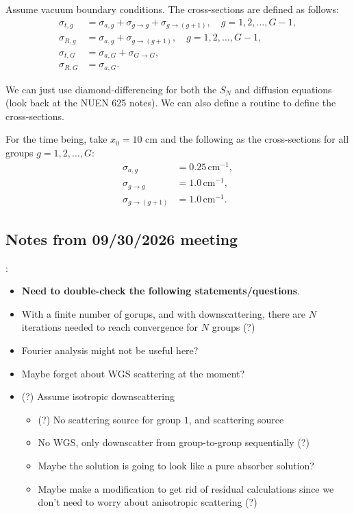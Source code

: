 \documentclass{article}
\newcommand{\parens}[1]{\left( #1 \right)}
\begin{document}
Assume vacuum boundary conditions.
The cross-sections are defined as follows:
\begin{align}
  \sigma_{t, g} & = \sigma_{a, g} + \sigma_{g \rightarrow g} + \sigma_{g \rightarrow \parens{g + 1}}, \quad g = 1, 2, \ldots, G - 1, \\
  \sigma_{R, g} & = \sigma_{a, g} + \sigma_{g \rightarrow \parens{g + 1}}, \quad g = 1, 2, \ldots, G - 1,                            \\
  \sigma_{t, G} & = \sigma_{a, G} + \sigma_{G \rightarrow G},                                                                        \\
  \sigma_{R, G} & = \sigma_{a, G}.
\end{align}

We can just use diamond-differencing for both the $S_{N}$ and diffusion equations (look back at the NUEN 625 notes).
We can also define a routine to define the cross-sections.

For the time being, take $x_{0} = 10$ cm and the following as the cross-sections for all groups $g = 1, 2, \ldots, G$:
\begin{align}
  \sigma_{a, g}                         & = 0.25 \, \text{cm}^{-1}, \\
  \sigma_{g \rightarrow g}              & = 1.0 \, \text{cm}^{-1},  \\
  \sigma_{g \rightarrow \parens{g + 1}} & = 1.0 \, \text{cm}^{-1}.
\end{align}

\subsection{Notes from 09/30/2026 meeting}:
\begin{itemize}
  \item \textbf{Need to double-check the following statements/questions}.
  \item With a finite number of gorups, and with downscattering, there are $N$ iterations needed to reach convergence for $N$ groups (?)
  \item Fourier analysis might not be useful here?
  \item Maybe forget about WGS scattering at the moment?
  \item (?) Assume isotropic downscattering
        \begin{itemize}
          \item (?) No scattering source for group $1$, and scattering source
          \item No WGS, only downscatter from group-to-group sequentially (?)
          \item Maybe the solution is going to look like a pure absorber solution?
          \item Maybe make a modification to get rid of residual calculations since we don't need to worry about anisotropic scattering (?)
        \end{itemize}
\end{itemize}
\end{document}
